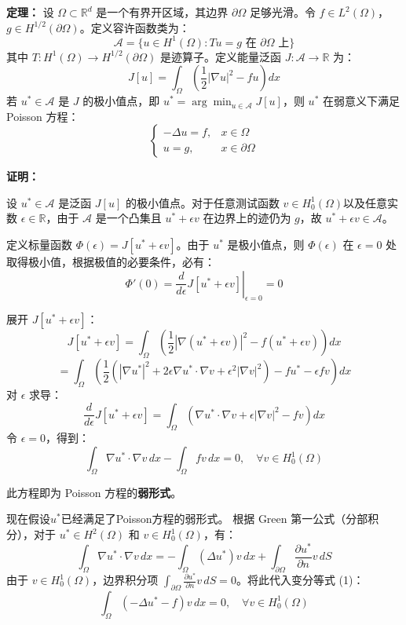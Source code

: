 	\textbf{定理：} 设 $\Omega \subset \mathbb{R}^d$ 是一个有界开区域，其边界 $\partial\Omega$ 足够光滑。令 $f \in L^2(\Omega)$，$g \in H^{1/2}(\partial\Omega)$。定义容许函数类为：
	\[ \mathcal{A} = \{ u \in H^1(\Omega) : Tu = g \text{ 在 } \partial\Omega \text{ 上} \} \]
	其中 $T: H^1(\Omega) \to H^{1/2}(\partial\Omega)$ 是迹算子。定义能量泛函 $J: \mathcal{A} \to \mathbb{R}$ 为：
	\[ J[u] = \int_{\Omega} \left( \frac{1}{2} |\nabla u|^2 - f u \right) dx \]
	若 $u^* \in \mathcal{A}$ 是 $J$ 的极小值点，即 $u^* = \arg\min_{u \in \mathcal{A}} J[u]$，则 $u^*$ 在弱意义下满足 Poisson 方程：
	\[ 
	\begin{cases} 
		-\Delta u = f, & x \in \Omega \\ 
		u = g, & x \in \partial\Omega 
	\end{cases}
	\]
	
	\textbf{证明：}
	
	设 $u^* \in \mathcal{A}$ 是泛函 $J[u]$ 的极小值点。对于任意测试函数 $v \in H^1_0(\Omega)$以及任意实数 $\epsilon \in \mathbb{R}$，由于 $\mathcal{A}$ 是一个凸集且 $u^* + \epsilon v$ 在边界上的迹仍为 $g$，故 $u^* + \epsilon v \in \mathcal{A}$。
	
	定义标量函数 $\Phi(\epsilon) = J[u^* + \epsilon v]$。由于 $u^*$ 是极小值点，则 $\Phi(\epsilon)$ 在 $\epsilon = 0$ 处取得极小值，根据极值的必要条件，必有：
	\[ \Phi'(0) = \left. \frac{d}{d\epsilon} J[u^* + \epsilon v] \right|_{\epsilon=0} = 0 \]
	
	展开 $J[u^* + \epsilon v]$：
	\[
	J[u^* + \epsilon v] = \int_{\Omega} \left( \frac{1}{2} |\nabla (u^* + \epsilon v)|^2 - f (u^* + \epsilon v) \right) dx
	\]
	\[
	= \int_{\Omega} \left( \frac{1}{2} (|\nabla u^*|^2 + 2\epsilon \nabla u^* \cdot \nabla v + \epsilon^2 |\nabla v|^2) - f u^* - \epsilon f v \right) dx
	\]
	对 $\epsilon$ 求导：
	\[
	\frac{d}{d\epsilon} J[u^* + \epsilon v] = \int_{\Omega} (\nabla u^* \cdot \nabla v + \epsilon |\nabla v|^2 - f v) dx
	\]
	令 $\epsilon = 0$，得到：
	$$	\boxed{
		\int_{\Omega} \nabla u^* \cdot \nabla v \, dx - \int_{\Omega} f v \, dx = 0, \quad \forall v \in H^1_0(\Omega)
	}$$
	
	此方程即为 Poisson 方程的\textbf{弱形式}。
	
	现在假设$u^*$已经满足了Poisson方程的弱形式。
	根据 Green 第一公式（分部积分），对于 $u^* \in H^2(\Omega)$ 和 $v \in H^1_0(\Omega)$，有：
	\[ \int_{\Omega} \nabla u^* \cdot \nabla v \, dx = -\int_{\Omega} (\Delta u^*) v \, dx + \int_{\partial\Omega} \frac{\partial u^*}{\partial n} v \, dS \]
	由于 $v \in H^1_0(\Omega)$，边界积分项 $\int_{\partial\Omega} \frac{\partial u^*}{\partial n} v \, dS = 0$。将此代入变分等式 (1)：
	\[ \int_{\Omega} (-\Delta u^* - f) v \, dx = 0, \quad \forall v \in H^1_0(\Omega) \]
	
